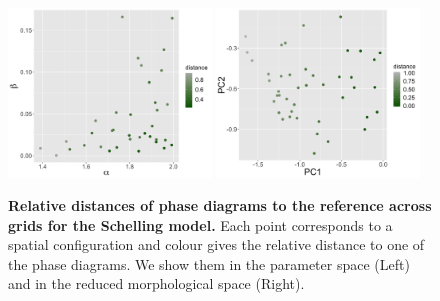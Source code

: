\documentclass[preprint,5p,times,twocolumn,authoryear]{elsarticle}
\begin{document}
\begin{figure}
\centering
\includegraphics[width=0.48\textwidth]{figures/schelling-relativedistance_metaparams_mean.png}
\includegraphics[width=0.48\textwidth]{figures/schelling-relativedistance_morphspace_mean.png}
\caption{\textbf{Relative distances of phase diagrams to the reference across grids for the Schelling model.} Each point corresponds to a spatial configuration and colour gives the relative distance to one of the phase diagrams. We show them in the parameter space (Left) and in the reduced morphological space (Right).\label{fig:schelling-distance-meta}}
\end{figure}


\section{}


\end{document}
